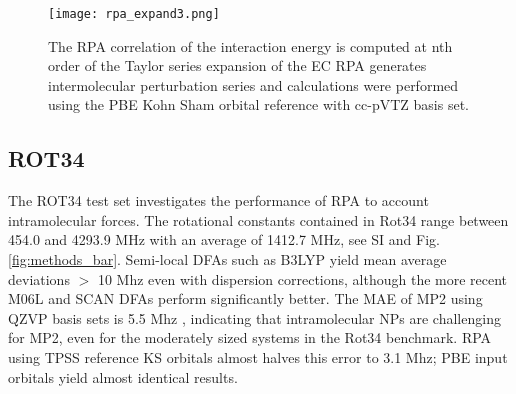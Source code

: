 \documentclass[twoside,twocolumn,9pt]{article}
\begin{document}
\begin{figure}
  \centering
  \texttt{[image: rpa\_expand3.png]}
  \caption{The RPA correlation of the interaction energy is computed at
    nth order of the Taylor series expansion of the EC RPA generates
    intermolecular perturbation series and calculations were performed
    using the PBE Kohn Sham orbital reference with cc-pVTZ basis set.}
  \label{fig:rpa_expand}
\end{figure}
%
%

\subsection{ROT34}
%
%

The ROT34 test set investigates the performance of RPA to account
intramolecular forces. The rotational constants contained in Rot34
range between 454.0 and 4293.9 MHz with an average of 1412.7 MHz, see
SI and Fig. \ref{fig:methods_bar}. Semi-local DFAs such as B3LYP 
yield mean average deviations $>$ 10 Mhz even with dispersion
corrections, although the more recent M06L and SCAN DFAs perform
significantly better\cite{BrandenburgPhysRevB}. The MAE
of MP2 using QZVP basis sets is 5.5 Mhz
\cite{Risthaus13JChemTheoryComput9p1580}, indicating that
intramolecular NPs are challenging for MP2, even for the moderately
sized systems in the Rot34 benchmark. RPA using TPSS reference KS
orbitals almost halves this error to 3.1 Mhz; PBE input orbitals yield
almost identical results. 

\end{document}
